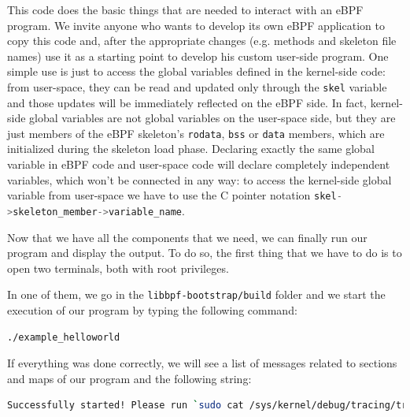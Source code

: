 This code does the basic things that are needed to interact with an eBPF program.
We invite anyone who wants to develop its own eBPF application to copy this code and, after the appropriate changes (e.g. methods and skeleton file names) use it as a starting point to develop his custom user-side program.
One simple use is just to access the global variables defined in the kernel-side code: from user-space, they can be read and updated only through the \colorbox{backcolour}{\lstinline[style=highlight, language=bash]|skel|} variable and those updates will be immediately reflected on the eBPF side. 
In fact, kernel-side global variables are not global variables on the user-space side, but they are just members of the eBPF skeleton’s \colorbox{backcolour}{\lstinline[style=cstyle, language=C]|rodata|}, \colorbox{backcolour}{\lstinline[style=cstyle, language=C]|bss|} or \colorbox{backcolour}{\lstinline[style=cstyle, language=C]|data|} members, which are initialized during the skeleton load phase. 
Declaring exactly the same global variable in eBPF code and user-space code will declare completely independent variables, which won’t be connected in any way: to access the kernel-side global variable from user-space we have to use the C pointer notation \colorbox{backcolour}{\lstinline[style=cstyle, language=C]|skel->skeleton_member->variable_name|}.

Now that we have all the components that we need, we can finally run our program and display the output.
To do so, the first thing that we have to do is to open two terminals, both with root privileges.

In one of them, we go in the \colorbox{backcolour}{\lstinline[style=highlight, language=bash]|libbpf-bootstrap/build|} folder and we start the execution of our program by typing the following command:

\begin{lstlisting}[style=commandline, language=bash, caption={libbpf-bootstrap program execution command}]
	./example_helloworld
\end{lstlisting}

If everything was done correctly, we will see a list of messages related to sections and maps of our program and the following string:

\begin{lstlisting}[style=commandline, language=bash, caption={libbpf-bootstrap program successful execution message}]
	Successfully started! Please run `sudo cat /sys/kernel/debug/tracing/trace_pipe` to see output of the BPF programs.
\end{lstlisting}

